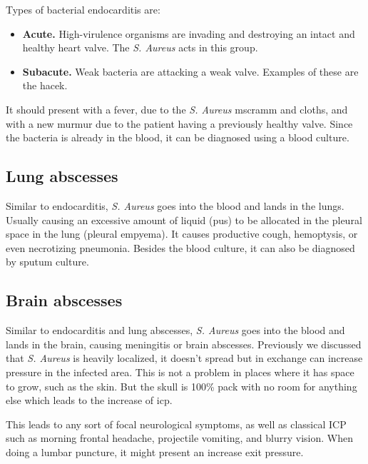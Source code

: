 Types of bacterial endocarditis are:

\begin{itemize}

    \item \textbf{Acute.} High-virulence organisms are invading and destroying an intact and healthy heart valve. The \textit{S. Aureus} acts in this group.
    
    \item \textbf{Subacute.} Weak bacteria are attacking a weak valve. Examples of these are the \gls{hacek}.
    
\end{itemize}

It should present with a fever, due to the \textit{S. Aureus} \gls{mscramm} and cloths, and with a new murmur due to the patient having a previously healthy valve. Since the bacteria is already in the blood, it can be diagnosed using a blood culture.

\subsection{Lung abscesses}

Similar to endocarditis, \textit{S. Aureus} goes into the blood and lands in the lungs. Usually causing an excessive amount of liquid (pus) to be allocated in the pleural space in the lung (pleural empyema). It causes productive cough, hemoptysis, or even necrotizing pneumonia. Besides the blood culture, it can also be diagnosed by sputum culture.

\subsection{Brain abscesses}

Similar to endocarditis and lung abscesses, \textit{S. Aureus} goes into the blood and lands in the brain, causing meningitis or brain abscesses. Previously we discussed that \textit{S. Aureus} is heavily localized, it doesn't spread but in exchange can increase pressure in the infected area. This is not a problem in places where it has space to grow, such as the skin. But the skull is 100\% pack with no room for anything else which leads to the increase of \gls{icp}.

This leads to any sort of focal neurological symptoms, as well as classical ICP such as morning frontal headache, projectile vomiting, and blurry vision. When doing a lumbar puncture, it might present an increase exit pressure.

